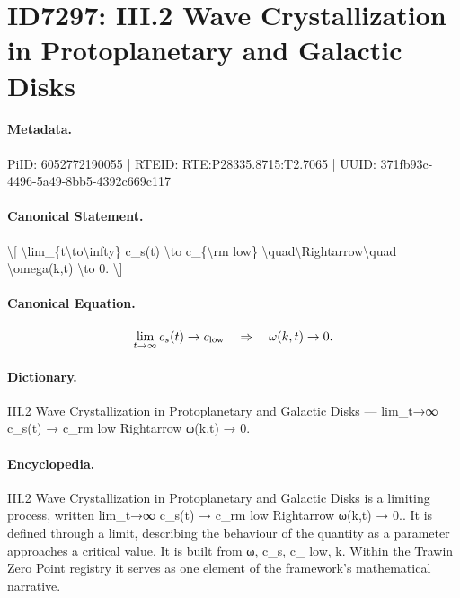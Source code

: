 \section*{ID7297: III.2 Wave Crystallization in Protoplanetary and Galactic Disks}
\paragraph{Metadata.}
PiID: 6052772190055 | RTEID: RTE:P28335.8715:T2.7065 | UUID: 371fb93c-4496-5a49-8bb5-4392c669c117

\paragraph{Canonical Statement.}
\textbackslash{}[ \textbackslash{}lim\_\{t\textbackslash{}to\textbackslash{}infty\} c\_s(t) \textbackslash{}to c\_\{\textbackslash{}rm low\} \textbackslash{}quad\textbackslash{}Rightarrow\textbackslash{}quad \textbackslash{}omega(k,t) \textbackslash{}to 0. \textbackslash{}]

\paragraph{Canonical Equation.}
\[
\lim_{t\to\infty} c_s(t) \to c_{\rm low} \quad\Rightarrow\quad \omega(k,t) \to 0.
\]

\paragraph{Dictionary.}
III.2 Wave Crystallization in Protoplanetary and Galactic Disks — lim\_t→∞ c\_s(t) → c\_rm low Rightarrow ω(k,t) → 0.

\paragraph{Encyclopedia.}
III.2 Wave Crystallization in Protoplanetary and Galactic Disks is a limiting process, written lim\_t→∞ c\_s(t) → c\_rm low Rightarrow ω(k,t) → 0.. It is defined through a limit, describing the behaviour of the quantity as a parameter approaches a critical value. It is built from ω, c\_s, c\_ low, k. Within the Trawin Zero Point registry it serves as one element of the framework's mathematical narrative.
